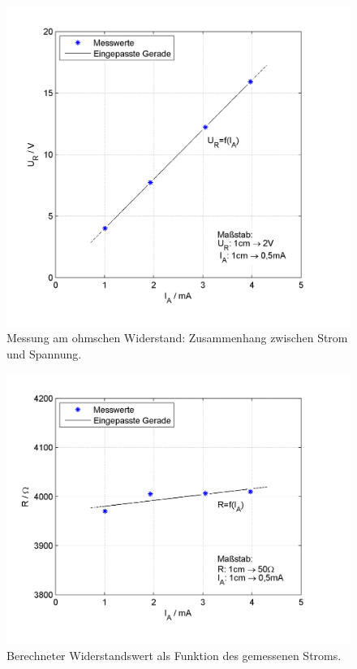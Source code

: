\documentclass[12pt,a4paper,ngerman]{article}
\begin{document}
\begin{figure}[!ht]
	\begin{center}
		\includegraphics{./../03_PICS/spannungstrom}\vspace*{-1cm}
		\caption{Messung am ohmschen Widerstand: Zusammenhang zwischen
			Strom und Spannung.}
		\label{fig:spannungstrom}
	\end{center}
\end{figure}

\begin{figure}[!ht]
	\begin{center}
		\includegraphics{./../03_PICS/widerstand}\vspace*{-1cm}
		\caption{Berechneter Widerstandswert als Funktion des gemessenen Stroms.}
		\label{fig:widerstand}
	\end{center}
\end{figure}
\end{document}
